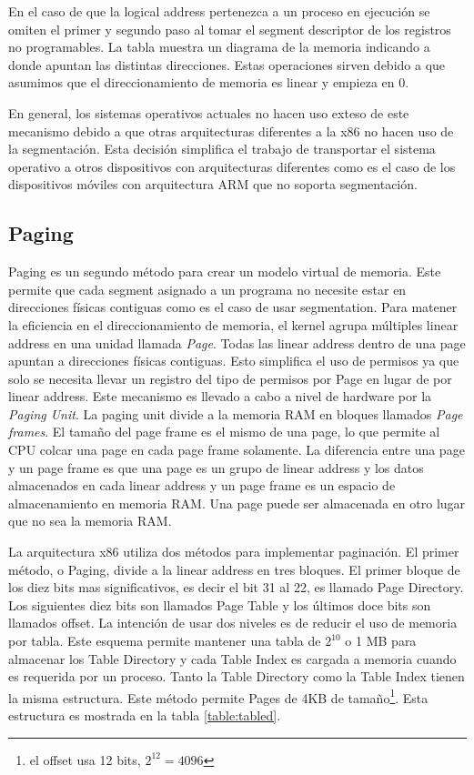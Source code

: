 En el caso de que la logical address pertenezca a un proceso en
ejecución se omiten el primer y segundo paso al tomar el segment descriptor de
los registros no programables. La tabla {} muestra un diagrama de la memoria
indicando a donde apuntan las distintas direcciones. Estas operaciones sirven
debido a que asumimos que el direccionamiento de memoria es linear y empieza en
0.

En general, los sistemas operativos actuales no hacen uso exteso de este
mecanismo debido a que otras arquitecturas diferentes a la x86 no hacen uso de
la segmentación. Esta decisión simplifica el trabajo de transportar el sistema
operativo a otros dispositivos con arquitecturas diferentes como es el caso de
los dispositivos móviles con arquitectura ARM que no soporta segmentación.

\subsection{Paging} 
Paging es un segundo método para crear un modelo virtual de memoria. Este
permite que cada segment asignado a un programa no necesite estar en
direcciones físicas contiguas como es el caso de usar segmentation. Para
matener la eficiencia en el direccionamiento de memoria, el kernel agrupa
múltiples linear address en una unidad llamada \emph{Page}. Todas las linear
address dentro de una page apuntan a direcciones físicas contiguas. Esto
simplifica el uso de permisos ya que solo se necesita llevar un registro del
tipo de permisos por Page en lugar de por linear address. Este mecanismo es
llevado a cabo a nivel de hardware por la \emph{Paging Unit}. La paging unit
divide a la memoria RAM en bloques llamados \emph{Page frames}. El tamaño del
page frame es el mismo de una page, lo que permite al CPU colcar una page en
cada page frame solamente. La diferencia entre una page y un page frame es que
una page es un grupo de linear address y los datos almacenados en cada linear
address y un page frame es un espacio de almacenamiento en memoria RAM. Una
page puede ser almacenada en otro lugar que no sea la memoria RAM.

La arquitectura x86 utiliza dos métodos para implementar paginación. El primer
método, o Paging, divide a la linear address en tres bloques. El primer bloque
de los diez bits mas significativos, es decir el bit 31 al 22, es llamado Page
Directory. Los siguientes diez bits son llamados Page Table y los últimos doce
bits son llamados offset. La intención de usar dos niveles es de reducir el uso
de memoria por tabla. Este esquema permite mantener una tabla de $2^{10}$ o 1 MB
para almacenar los Table Directory y cada Table Index es cargada a memoria
cuando es requerida por un proceso. Tanto la Table Directory como la Table
Index tienen la misma estructura. Este método permite Pages de 4KB de
tamaño\footnote{el offset usa 12 bits, $2^12=4096$}. Esta estructura es
mostrada en la tabla \ref{table:tabled}.

